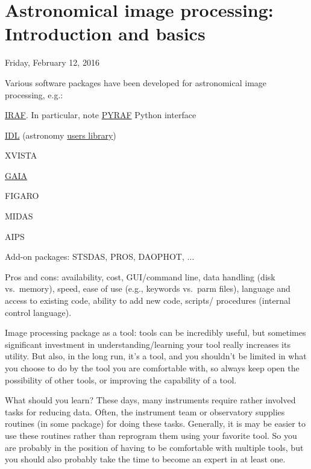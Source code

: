 \documentclass{article}
\begin{document}
\section{Astronomical image processing: Introduction and basics}
\textcolor{date}{Friday, February 12, 2016}

Various software packages have been developed for astronomical image
processing, e.g.:

\begin{itemize*}
    \item \href{http://iraf.noao.edu}{IRAF}.
        In particular, note
        \href{http://www.stsci.edu/institute/software_hardware/pyraf}
        {PYRAF} Python interface
    \item
        \href{http://www.harrisgeospatial.com/docs/using_idl_home.html}
        {IDL} (astronomy
        \href{http://idlastro.gsfc.nasa.gov/homepage.html}{users library})
    \item XVISTA
    \item \href{http://star-www.dur.ac.uk/~pdraper/gaia/gaia.html}{GAIA}
    \item FIGARO
    \item MIDAS
    \item AIPS
    \item Add-on packages: STSDAS, PROS, DAOPHOT, $\ldots$
\end{itemize*}
Pros and cons: availability, cost, GUI/command line, data handling
(disk vs.\ memory), speed, ease of use (e.g., keywords vs.\ parm files),
language and access to existing code, ability to add new code,
scripts/ procedures (internal control language).

Image processing package as a tool: tools can be incredibly useful,
but sometimes significant investment in understanding/learning your
tool really increases its utility. But also, in the long run, it's a
tool, and you shouldn't be limited in what you choose to do by the
tool you are comfortable with, so always keep open the possibility of
other tools, or improving the capability of a tool.

What should you learn? These days, many instruments require rather
involved tasks for reducing data. Often, the instrument team or
observatory supplies routines (in some package) for doing these tasks.
Generally, it is may be easier to use these routines rather than
reprogram them using your favorite tool. So you are probably in the
position of having to be comfortable with multiple tools, but you
should also probably take the time to become an expert in at least
one.
\end{document}
